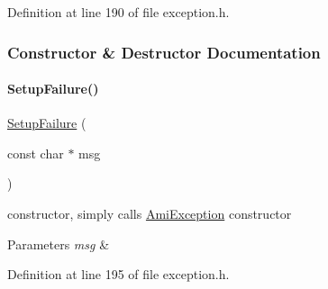 Definition at line 190 of file exception.\+h.



\subsubsection{Constructor \& Destructor Documentation}
\mbox{\label{classamici_1_1_setup_failure_a86aa3460075a61cb0fe5f749bb1476f1}} 
\paragraph{\texorpdfstring{SetupFailure()}{SetupFailure()}}
{\footnotesize\ttfamily \mbox{\hyperlink{classamici_1_1_setup_failure}{Setup\+Failure}} (\begin{DoxyParamCaption}\item[{const char $\ast$}]{msg }\end{DoxyParamCaption})\hspace{0.3cm}{\ttfamily [explicit]}}

constructor, simply calls \mbox{\hyperlink{classamici_1_1_ami_exception}{Ami\+Exception}} constructor 
\begin{DoxyParams}{Parameters}
{\em msg} & \\
\hline
\end{DoxyParams}


Definition at line 195 of file exception.\+h.

